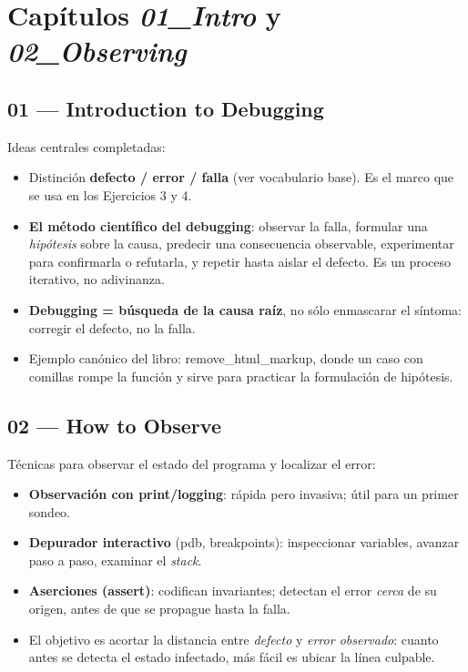 \documentclass[11pt,a4paper]{article}
\newcommand{\code}[1]{\colorbox{codebg}{\ttfamily\small #1}}
\begin{document}
\section{Capítulos \emph{01\_Intro} y \emph{02\_Observing}}

\subsection*{01 --- Introduction to Debugging}
Ideas centrales completadas:
\begin{itemize}[leftmargin=1.4em, itemsep=2pt]
  \item Distinción \textbf{defecto / error / falla} (ver vocabulario base). Es el marco que se usa en los Ejercicios 3 y 4.
  \item \textbf{El método científico del debugging}: observar la falla, formular una \emph{hipótesis} sobre la causa, predecir una consecuencia observable, experimentar para confirmarla o refutarla, y repetir hasta aislar el defecto. Es un proceso iterativo, no adivinanza.
  \item \textbf{Debugging = búsqueda de la causa raíz}, no sólo enmascarar el síntoma: corregir el defecto, no la falla.
  \item Ejemplo canónico del libro: \code{remove\_html\_markup}, donde un caso con comillas rompe la función y sirve para practicar la formulación de hipótesis.
\end{itemize}

\subsection*{02 --- How to Observe}
Técnicas para observar el estado del programa y localizar el error:
\begin{itemize}[leftmargin=1.4em, itemsep=2pt]
  \item \textbf{Observación con \code{print}/logging}: rápida pero invasiva; útil para un primer sondeo.
  \item \textbf{Depurador interactivo} (\code{pdb}, breakpoints): inspeccionar variables, avanzar paso a paso, examinar el \emph{stack}.
  \item \textbf{Aserciones (\code{assert})}: codifican invariantes; detectan el error \emph{cerca} de su origen, antes de que se propague hasta la falla.
  \item El objetivo es acortar la distancia entre \emph{defecto} y \emph{error observado}: cuanto antes se detecta el estado infectado, más fácil es ubicar la línea culpable.
\end{itemize}
\end{document}
